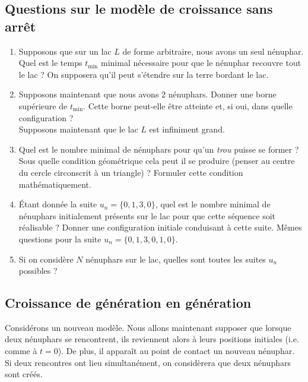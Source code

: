 \documentclass{../ficheTDTP}
\begin{document}
	\subsection{Questions sur le modèle de \og croissance sans arrêt\fg}
\begin{enumerate}

	\item Supposons que sur un lac $L$ de forme arbitraire, nous avons un seul nénuphar. Quel est le temps $t_\mathrm{min}$ minimal nécessaire pour que le nénuphar recouvre tout le lac ? On supposera qu'il peut s'étendre sur la terre bordant le lac.

	\item Supposons maintenant que nous avons $2$ nénuphars. Donner une borne supérieure de $t_\mathrm{min}$. Cette borne peut-elle être atteinte et, si oui, dans quelle configuration ?\\

\noindent Supposons maintenant que le lac $L$ est infiniment grand.\\

	\item Quel est le nombre minimal de nénuphars pour qu'un \textit{trou} puisse se former ? Sous quelle condition géométrique cela peut il se produire (penser au centre du cercle circonscrit à un triangle) ? Formuler cette condition mathématiquement.

	\item Étant donnée la suite $u_n = \{ 0,1,3,0\}$, quel est le nombre minimal de nénuphars initialement présents sur le lac pour que cette séquence soit réalisable ? Donner une configuration initiale conduisant à cette suite. Mêmes questions pour la suite $u_n = \{ 0,1,3,0,1,0\}$.

	\item Si on considère $N$ nénuphars sur le lac, quelles sont toutes les suites $u_n$ possibles ?\\
\end{enumerate}

	\subsection{Croissance de génération en génération} Considérons un nouveau modèle. Nous allons maintenant supposer que lorsque deux nénuphars se rencontrent, ils reviennent alors à leurs positions initiales (i.e. comme à $t=0$). De plus, il apparaît au point de contact un nouveau nénuphar. Si deux rencontres ont lieu simultanément, on considèrera que deux nénuphars sont créés.\\
\end{document}
